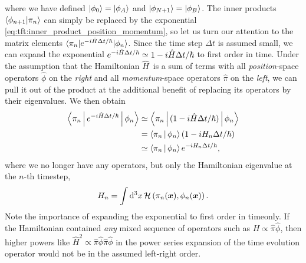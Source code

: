 where we have defined $\ket{\phi_0} = \ket{\phi_A}$ and $\ket{\phi_{N+1}} = \ket{\phi_B}$.
The inner products $\braket{\phi_{n+1} | \pi_n}$ can simply be replaced by the exponential \eqref{eq:tft:inner_product_position_momentum}, so let us turn our attention to the matrix elements $\braket{\pi_n | e^{- i \hat{H} \Delta t / \hbar} | \phi_n}$.
Since the time step $\Delta t$ is assumed small, we can expand the exponential $e^{- i \hat{H} \Delta t / \hbar} \simeq 1 - i \hat{H} \Delta t / \hbar$ to first order in time.
Under the assumption that the Hamiltonian $\hat{H}$ is a sum of terms with all \emph{position}-space operators $\hat{\phi}$ on the \emph{right} and all \emph{momentum}-space operators $\hat{\pi}$ on the \emph{left}, we can pull it out of the product at the additional benefit of replacing its operators by their eigenvalues.
We then obtain
\begin{equation}
\begin{split}
	\Braket{\pi_n | e^{- i \hat{H} \Delta t / \hbar} | \phi_n} &\simeq \Braket{\pi_n | (1 - i \hat{H} \Delta t / \hbar) | \phi_n} \\
	                                                   &=       \Braket{\pi_n | \phi_n} (1 - i H_n \Delta t / \hbar) \\
	                                                   &\simeq \Braket{\pi_n | \phi_n} e^{- i H_n \Delta t / \hbar}, \\
\end{split}
\label{eq:tft:path_integral_hamiltonian_assumption}
\end{equation}
where we no longer have any operators, but only the Hamiltonian eigenvalue at the $n$-th timestep,
\begin{equation}
	H_n = \int \mathop{}\!\mathrm{d}^3 x \, \mathcal{H} \left( \pi_n({\bm{x}}), \phi_n({\bm{x}}) \right) .
\label{eq:tft:hamiltonian_eigenvalues}
\end{equation}
Note the importance of expanding the exponential to first order in timeonly.
If the Hamiltonian contained \emph{any} mixed sequence of operators such as $H \propto \hat{\pi} \hat{\phi}$, then higher powers like $\hat{H}^2 \propto \hat{\pi} \hat{\phi} \hat{\pi} \hat{\phi}$ in the power series expansion of the time evolution operator would not be in the assumed left-right order.


